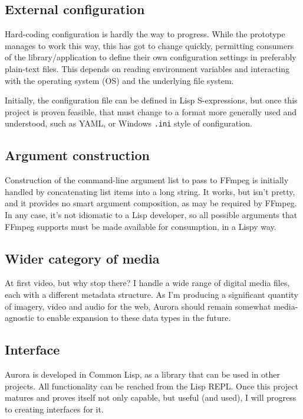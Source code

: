 \documentclass{article}
\begin{document}
\subsection{External configuration}
\label{sec:org69b395b}

Hard-coding configuration is hardly the way to progress. While the prototype
manages to work this way, this has got to change quickly, permitting consumers
of the library/application to define their own configuration settings in
preferably plain-text files. This depends on reading environment variables and
interacting with the operating system (OS) and the underlying file system.

Initially, the configuration file can be defined in Lisp S-expressions, but once
this project is proven feasible, that must change to a format more generally
used and understood, such as YAML, or Windows \texttt{.ini} style of configuration.

\subsection{Argument construction}
\label{sec:orgf720fff}

Construction of the command-line argument list to pass to FFmpeg is initially
handled by concatenating list items into a long string. It works, but isn't
pretty, and it provides no smart argument composition, as may be required by
FFmpeg. In any case, it's not idiomatic to a Lisp developer, so all possible
arguments that FFmpeg supports must be made available for consumption, in a
Lispy way.

\subsection{Wider category of media}
\label{sec:org26abce6}

At first video, but why stop there? I handle a wide range of digital media
files, each with a different metadata structure. As I'm producing a significant
quantity of imagery, video and audio for the web, Aurora should remain somewhat
media-agnostic to enable expansion to these data types in the future.

\subsection{Interface}
\label{sec:orgbc997ed}

Aurora is developed in Common Lisp, as a library that can be used in other
projects. All functionality can be reached from the Lisp REPL. Once this
project matures and proves itself not only capable, but useful (and used), I
will progress to creating interfaces for it.
\end{document}
